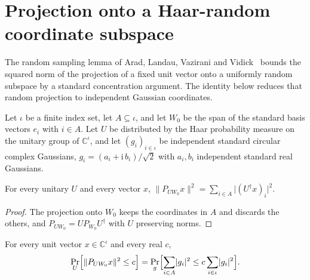 \section{Projection onto a Haar-random coordinate subspace}

The random sampling lemma of Arad, Landau, Vazirani and
Vidick~\cite[lines 532--547]{Arad2016RigorousRG} bounds the squared norm of the
projection of a fixed unit vector onto a uniformly random subspace by a
standard concentration argument. The identity below reduces that random
projection to independent Gaussian coordinates.

Let $\iota$ be a finite index set, let $A\subseteq\iota$, and let $W_0$ be the
span of the standard basis vectors $e_i$ with $i\in A$. Let $U$ be distributed
by the Haar probability measure on the unitary group of $\mathbb{C}^\iota$, and
let $(g_i)_{i\in\iota}$ be independent standard circular complex Gaussians,
$g_i=(a_i+\mathrm{i}\,b_i)/\sqrt2$ with $a_i,b_i$ independent standard real
Gaussians.

\begin{theorem}
    \label{thm:haar_projection_coordinate_weight}
    \leanok
    For every unitary $U$ and every vector $x$,
    $\lVert P_{UW_0}x\rVert^2=\sum_{i\in A}\lvert(U^\dagger x)_i\rvert^2$.
\end{theorem}

\begin{proof}
    \leanok
    The projection onto $W_0$ keeps the coordinates in $A$ and discards the
    others, and $P_{UW_0}=U P_{W_0}U^\dagger$ with $U$ preserving norms.
\end{proof}

\begin{theorem}
    \label{thm:haar_projection_law}
    \leanok
    For every unit vector $x\in\mathbb{C}^\iota$ and every real $c$,
    \[
        \Pr_U\Bigl[\lVert P_{UW_0}x\rVert^2\le c\Bigr]
        =\Pr_g\Bigl[\sum_{i\in A}\lvert g_i\rvert^2
            \le c\sum_{i\in\iota}\lvert g_i\rvert^2\Bigr].
    \]
\end{theorem}

